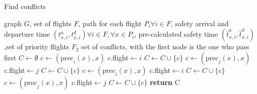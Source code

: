 \documentclass[../main.tex]{subfiles}
\begin{document}
\begin{algorithm}
\caption{Find conflicts}
\label{algo:findConflictsHyper}
\begin{algorithmic}
\Require graph $G$, set of flights $F$, path for each flight $P_i\forall i\in F$, safety arrival and departure time $(t_{x,i}^a,t_{x,i}^d) \forall i\in F, \forall x\in P_i$, pre-calculated safety time $(\hat t^a_{x,i},\hat t^d_{x,i})$,set of priority flights $F_2$
\Ensure set of conflicts, with the first node is the one who pass first
\State $C\gets \emptyset$
                    \State $c \gets (\text{prec}_i(x),x)$
                    \State $c.$flight$\gets i$
                    \State $C\gets C\cup\{c\}$
                    \State $c \gets (\text{prec}_j(x),x)$
                    \State $c.$flight$\gets j$
                    \State $C\gets C\cup\{c\}$                
                \Else
                        \State $c \gets (\text{prec}_i(x),x)$
                        \State $c.$flight$\gets i$
                        \State $C\gets C\cup\{c\}$                    
                    \Else
                        \State $c \gets (\text{prec}_j(x),x)$
                        \State $c.$flight$\gets j$
                        \State $C\gets C\cup\{c\}$
                    \EndIf
                \EndIf
            \EndIf
        \EndFor
    \EndFor
\EndFor
\State \textbf{return} C
\end{algorithmic}
\end{algorithm}
\end{document}
